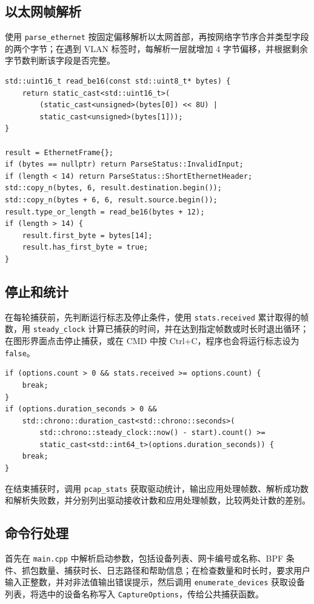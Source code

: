 \documentclass[UTF8,a4paper,11pt,scheme=chinese]{ctexart}
\newcommand{\code}[1]{\texttt{#1}}
\begin{document}
\subsection{以太网帧解析}
使用 \code{parse\_ethernet} 按固定偏移解析以太网首部，再按网络字节序合并类型字段的两个字节；在遇到 VLAN 标签时，每解析一层就增加 4 字节偏移，并根据剩余字节数判断该字段是否完整。
\begin{lstlisting}
std::uint16_t read_be16(const std::uint8_t* bytes) {
    return static_cast<std::uint16_t>(
        (static_cast<unsigned>(bytes[0]) << 8U) |
        static_cast<unsigned>(bytes[1]));
}

result = EthernetFrame{};
if (bytes == nullptr) return ParseStatus::InvalidInput;
if (length < 14) return ParseStatus::ShortEthernetHeader;
std::copy_n(bytes, 6, result.destination.begin());
std::copy_n(bytes + 6, 6, result.source.begin());
result.type_or_length = read_be16(bytes + 12);
if (length > 14) {
    result.first_byte = bytes[14];
    result.has_first_byte = true;
}
\end{lstlisting}

\subsection{停止和统计}
在每轮捕获前，先判断运行标志及停止条件，使用 \code{stats.received} 累计取得的帧数，用 \code{steady\_clock} 计算已捕获的时间，并在达到指定帧数或时长时退出循环；在图形界面点击停止捕获，或在 CMD 中按 Ctrl+C，程序也会将运行标志设为 \code{false}。
\begin{lstlisting}
if (options.count > 0 && stats.received >= options.count) {
    break;
}
if (options.duration_seconds > 0 &&
    std::chrono::duration_cast<std::chrono::seconds>(
        std::chrono::steady_clock::now() - start).count() >=
        static_cast<std::int64_t>(options.duration_seconds)) {
    break;
}
\end{lstlisting}

在结束捕获时，调用 \code{pcap\_stats} 获取驱动统计，输出应用处理帧数、解析成功数和解析失败数，并分别列出驱动接收计数和应用处理帧数，比较两处计数的差别。

\subsection{命令行处理}
首先在 \code{main.cpp} 中解析启动参数，包括设备列表、网卡编号或名称、BPF 条件、抓包数量、捕获时长、日志路径和帮助信息；在检查数量和时长时，要求用户输入正整数，并对非法值输出错误提示，然后调用 \code{enumerate\_devices} 获取设备列表，将选中的设备名称写入 \code{CaptureOptions}，传给公共捕获函数。
\end{document}
